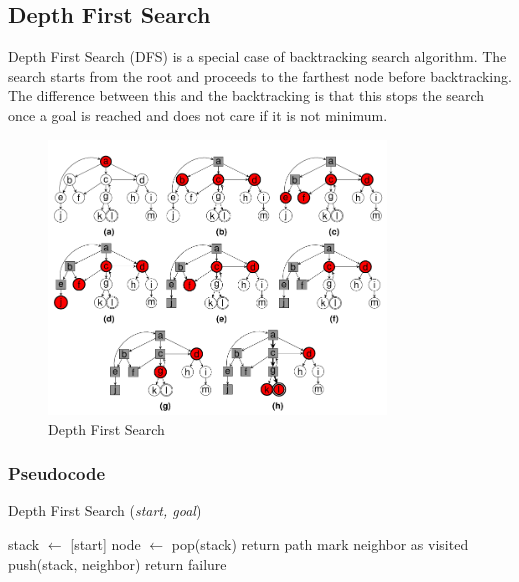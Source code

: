 \subsection{Depth First Search}
\noindent Depth First Search (DFS) is a special case of backtracking search algorithm. The search starts from the root and proceeds to the farthest node before backtracking. The difference between this and the backtracking is that this stops the search once a goal is reached and does not care if it is not minimum.

\begin{figure}[H]
	\centering
	\includegraphics[width=0.8\textwidth]{./imgs/dfs.png}
	\caption{Depth First Search}
\end{figure}

\subsubsection{Pseudocode}
\begin{algorithm}[H]
	\caption{Depth First Search (\textit{start, goal})}\label{alg:dfs}
	\begin{algorithmic}[1]
		\State stack \(\gets\) [start]
		\State node \(\gets\) pop(stack)
		\State return path
		\EndIf
		\State mark neighbor as visited
		\State push(stack, neighbor)
		\EndIf
		\EndFor
		\EndWhile
		\State return failure
	\end{algorithmic}
\end{algorithm}

